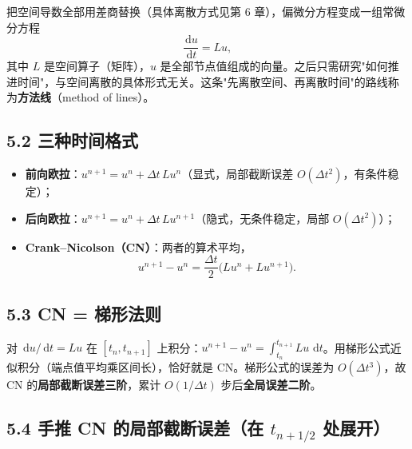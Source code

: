 \documentclass[12pt,a4paper]{ctexart}
\newcommand{\dd}{\,\mathrm{d}}
\begin{document}
把空间导数全部用差商替换（具体离散方式见第 6 章），偏微分方程变成一组常微分方程
\begin{equation}
\frac{\dd u}{\dd t}=Lu,
\end{equation}
其中 $L$ 是空间算子（矩阵），$u$ 是全部节点值组成的向量。之后只需研究"如何推进时间"，与空间离散的具体形式无关。这条"先离散空间、再离散时间"的路线称为\textbf{方法线}（method of lines）。

\subsection{5.2 三种时间格式}

\begin{itemize}[leftmargin=2em]
\item \textbf{前向欧拉}：$u^{n+1}=u^n+\Delta t\,Lu^n$（显式，局部截断误差 $O(\Delta t^2)$，有条件稳定）；
\item \textbf{后向欧拉}：$u^{n+1}=u^n+\Delta t\,Lu^{n+1}$（隐式，无条件稳定，局部 $O(\Delta t^2)$）；
\item \textbf{Crank--Nicolson（CN）}：两者的算术平均，
\begin{equation}
u^{n+1}-u^n=\frac{\Delta t}{2}\bigl(Lu^{n}+Lu^{n+1}\bigr).
\end{equation}
\end{itemize}

\subsection{5.3 CN = 梯形法则}

对 $\dd u/\dd t=Lu$ 在 $[t_n,t_{n+1}]$ 上积分：$u^{n+1}-u^n=\int_{t_n}^{t_{n+1}}Lu\,\dd t$。用梯形公式近似积分（端点值平均乘区间长），恰好就是 CN。梯形公式的误差为 $O(\Delta t^3)$，故 CN 的\textbf{局部截断误差三阶}，累计 $O(1/\Delta t)$ 步后\textbf{全局误差二阶}。

\subsection{5.4 手推 CN 的局部截断误差（在 $t_{n+1/2}$ 处展开）}
\end{document}
